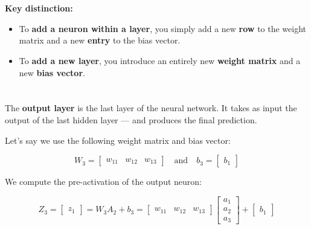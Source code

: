 \documentclass[11pt]{article}
\begin{document}
\section*{}

\vspace{0.5em}

\textbf{Key distinction:}

\begin{itemize}
    \item To \textbf{add a neuron within a layer}, you simply add a new \textbf{row} to the weight matrix and a new \textbf{entry} to the bias vector.
    \item To \textbf{add a new layer}, you introduce an entirely new \textbf{weight matrix} and a new \textbf{bias vector}.
\end{itemize}

\vspace{1em}
\section*{}

The \textbf{output layer} is the last layer of the neural network.  
It takes as input the output of the last hidden layer — and produces the final prediction.

\vspace{1em}

Let’s say we use the following weight matrix and bias vector:

\[
W_3 = 
\begin{bmatrix}
w_{11} & w_{12} & w_{13}
\end{bmatrix}
\quad \text{and} \quad
b_3 = 
\begin{bmatrix}
b_1
\end{bmatrix}
\]

We compute the pre-activation of the output neuron:

\[
Z_3 = 
\begin{bmatrix}
z_1
\end{bmatrix}
= W_3 A_2 + b_3 = 
\begin{bmatrix}
w_{11} & w_{12} & w_{13}
\end{bmatrix}
\begin{bmatrix}
a_1 \\
a_2 \\
a_3
\end{bmatrix}
+
\begin{bmatrix}
b_1
\end{bmatrix}
\]
\end{document}
